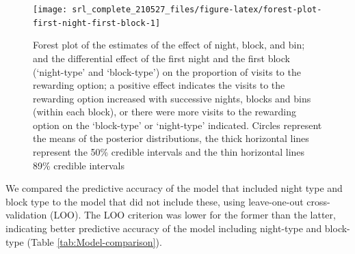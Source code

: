 \documentclass[
]{article}
\begin{document}
\begin{figure}[H]

{\centering \texttt{[image: srl\_complete\_210527\_files/figure-latex/forest-plot-first-night-first-block-1]} 

}

\caption{Forest plot of the estimates of the effect of night, block, and bin; and the differential effect of the first night and the first block (`night-type' and `block-type') on the proportion of visits to the rewarding option; a positive effect indicates the visits to the rewarding option increased with successive nights, blocks and bins (within each block), or there were more visits to the rewarding option on the `block-type' or `night-type' indicated. Circles represent the means of the posterior distributions, the thick horizontal lines represent the 50\% credible intervals and the thin horizontal lines 89\% credible intervals}\label{fig:forest-plot-first-night-first-block}
\end{figure}

We compared the predictive accuracy of the model that included night type and block type to the model that did not include these, using leave-one-out cross-validation (LOO). The LOO criterion was lower for the former than the latter, indicating better predictive accuracy of the model including night-type and block-type (Table \ref{tab:Model-comparison}).

\providecommand{\docline}[3]{\noalign{\global\setlength{\arrayrulewidth}{#1}}\arrayrulecolor[HTML]{#2}\cline{#3}}

\setlength{\tabcolsep}{2pt}

\renewcommand*{\arraystretch}{1.5}
\end{document}
